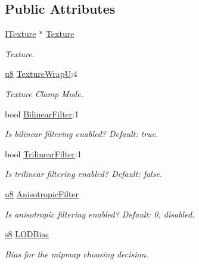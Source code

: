 \subsection*{Public Attributes}
\begin{DoxyCompactItemize}
\item 
\mbox{\label{classirr_1_1video_1_1SMaterialLayer_a450b66ca9a49e592aa733eb6c892944f}} 
\hyperlink{classirr_1_1video_1_1ITexture}{I\+Texture} $\ast$ \hyperlink{classirr_1_1video_1_1SMaterialLayer_a450b66ca9a49e592aa733eb6c892944f}{Texture}
\begin{DoxyCompactList}\small\item\em Texture. \end{DoxyCompactList}\item 
\hyperlink{namespaceirr_a646874f69af8ff87fc10201b0254a761}{u8} \hyperlink{classirr_1_1video_1_1SMaterialLayer_afb8408075afd8e84c8ff7c46f7a899bb}{Texture\+WrapU}\+:4
\begin{DoxyCompactList}\small\item\em Texture Clamp Mode. \end{DoxyCompactList}\item 
\mbox{\label{classirr_1_1video_1_1SMaterialLayer_a72b122a636971204922d399ec6c0e8ac}} 
bool \hyperlink{classirr_1_1video_1_1SMaterialLayer_a72b122a636971204922d399ec6c0e8ac}{Bilinear\+Filter}\+:1
\begin{DoxyCompactList}\small\item\em Is bilinear filtering enabled? Default\+: true. \end{DoxyCompactList}\item 
bool \hyperlink{classirr_1_1video_1_1SMaterialLayer_ad1b093b1a8e26cb10156a02ac78bdf67}{Trilinear\+Filter}\+:1
\begin{DoxyCompactList}\small\item\em Is trilinear filtering enabled? Default\+: false. \end{DoxyCompactList}\item 
\hyperlink{namespaceirr_a646874f69af8ff87fc10201b0254a761}{u8} \hyperlink{classirr_1_1video_1_1SMaterialLayer_aed142b316a920ec8fc5e0df09d3de3eb}{Anisotropic\+Filter}
\begin{DoxyCompactList}\small\item\em Is anisotropic filtering enabled? Default\+: 0, disabled. \end{DoxyCompactList}\item 
\hyperlink{namespaceirr_adc3ec66d7537550be0fea1c9eeadd63d}{s8} \hyperlink{classirr_1_1video_1_1SMaterialLayer_a5d1ac213ab5b7bcab23464eefd102b53}{L\+O\+D\+Bias}
\begin{DoxyCompactList}\small\item\em Bias for the mipmap choosing decision. \end{DoxyCompactList}\end{DoxyCompactItemize}


